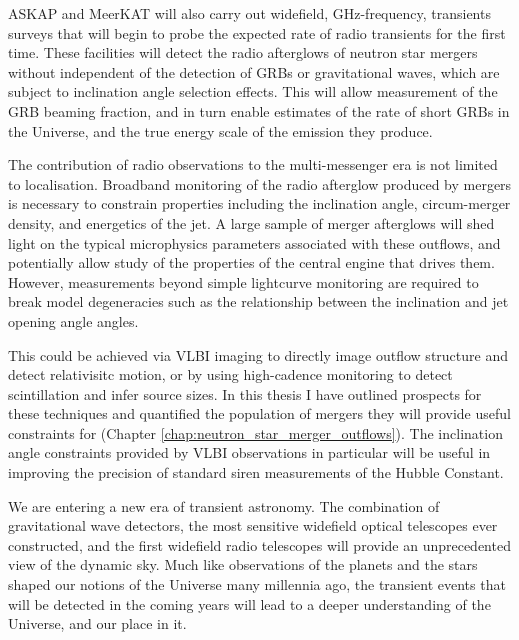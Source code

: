 ASKAP and MeerKAT will also carry out widefield, GHz-frequency, transients surveys that will begin to probe the expected rate of radio transients for the first time. These facilities will detect the radio afterglows of neutron star mergers without independent of the detection of GRBs or gravitational waves, which are subject to inclination angle selection effects. This will allow measurement of the GRB beaming fraction, and in turn enable estimates of the rate of short GRBs in the Universe, and the true energy scale of the emission they produce.

\clearpage
\pagebreak

The contribution of radio observations to the multi-messenger era is not limited to localisation. Broadband monitoring of the radio afterglow produced by mergers is necessary to constrain properties including the inclination angle, circum-merger density, and energetics of the jet. A large sample of merger afterglows will shed light on the typical microphysics parameters associated with these outflows, and potentially allow study of the properties of the central engine that drives them. However, measurements beyond simple lightcurve monitoring are required to break model degeneracies such as the relationship between the inclination and jet opening angle angles.

This could be achieved via VLBI imaging to directly image outflow structure and detect relativisitc motion, or by using high-cadence monitoring to detect scintillation and infer source sizes. In this thesis I have outlined prospects for these techniques and quantified the population of mergers they will provide useful constraints for (Chapter \ref{chap:neutron_star_merger_outflows}). The inclination angle constraints provided by VLBI observations in particular will be useful in improving the precision of standard siren measurements of the Hubble Constant.

We are entering a new era of transient astronomy. The combination of gravitational wave detectors, the most sensitive widefield optical telescopes ever constructed, and the first widefield radio telescopes will provide an unprecedented view of the dynamic sky. Much like observations of the planets and the stars shaped our notions of the Universe many millennia ago, the transient events that will be detected in the coming years will lead to a deeper understanding of the Universe, and our place in it.

\endgroup